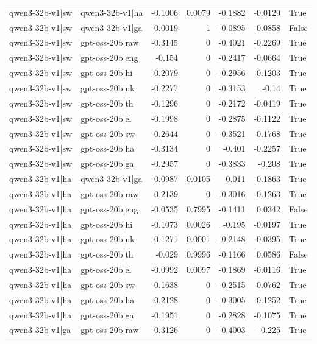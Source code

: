 \begin{table}
\begin{tabular}{l l r r r r l}
qwen3-32b-v1|sw & qwen3-32b-v1|ha & -0.1006 & 0.0079 & -0.1882 & -0.0129 & True \\
qwen3-32b-v1|sw & qwen3-32b-v1|ga & -0.0019 & 1 & -0.0895 & 0.0858 & False \\
qwen3-32b-v1|sw & gpt-oss-20b|raw & -0.3145 & 0 & -0.4021 & -0.2269 & True \\
qwen3-32b-v1|sw & gpt-oss-20b|eng & -0.154 & 0 & -0.2417 & -0.0664 & True \\
qwen3-32b-v1|sw & gpt-oss-20b|hi & -0.2079 & 0 & -0.2956 & -0.1203 & True \\
qwen3-32b-v1|sw & gpt-oss-20b|uk & -0.2277 & 0 & -0.3153 & -0.14 & True \\
qwen3-32b-v1|sw & gpt-oss-20b|th & -0.1296 & 0 & -0.2172 & -0.0419 & True \\
qwen3-32b-v1|sw & gpt-oss-20b|el & -0.1998 & 0 & -0.2875 & -0.1122 & True \\
qwen3-32b-v1|sw & gpt-oss-20b|sw & -0.2644 & 0 & -0.3521 & -0.1768 & True \\
qwen3-32b-v1|sw & gpt-oss-20b|ha & -0.3134 & 0 & -0.401 & -0.2257 & True \\
qwen3-32b-v1|sw & gpt-oss-20b|ga & -0.2957 & 0 & -0.3833 & -0.208 & True \\
qwen3-32b-v1|ha & qwen3-32b-v1|ga & 0.0987 & 0.0105 & 0.011 & 0.1863 & True \\
qwen3-32b-v1|ha & gpt-oss-20b|raw & -0.2139 & 0 & -0.3016 & -0.1263 & True \\
qwen3-32b-v1|ha & gpt-oss-20b|eng & -0.0535 & 0.7995 & -0.1411 & 0.0342 & False \\
qwen3-32b-v1|ha & gpt-oss-20b|hi & -0.1073 & 0.0026 & -0.195 & -0.0197 & True \\
qwen3-32b-v1|ha & gpt-oss-20b|uk & -0.1271 & 0.0001 & -0.2148 & -0.0395 & True \\
qwen3-32b-v1|ha & gpt-oss-20b|th & -0.029 & 0.9996 & -0.1166 & 0.0586 & False \\
qwen3-32b-v1|ha & gpt-oss-20b|el & -0.0992 & 0.0097 & -0.1869 & -0.0116 & True \\
qwen3-32b-v1|ha & gpt-oss-20b|sw & -0.1638 & 0 & -0.2515 & -0.0762 & True \\
qwen3-32b-v1|ha & gpt-oss-20b|ha & -0.2128 & 0 & -0.3005 & -0.1252 & True \\
qwen3-32b-v1|ha & gpt-oss-20b|ga & -0.1951 & 0 & -0.2828 & -0.1075 & True \\
qwen3-32b-v1|ga & gpt-oss-20b|raw & -0.3126 & 0 & -0.4003 & -0.225 & True \\

\end{tabular}
\end{table}
